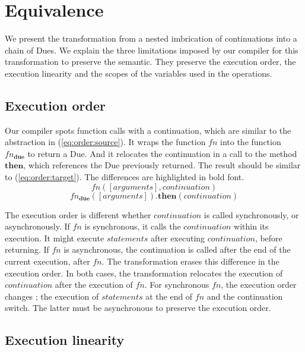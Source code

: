 \section{Equivalence} \label{section:equivalence}


We present the transformation from a nested imbrication of continuations into a chain of Dues.
We explain the three limitations imposed by our compiler for this transformation to preserve the semantic.
They preserve the execution order, the execution linearity and the scopes of the variables used in the operations.

\subsection{Execution order}

Our compiler spots function calls with a continuation, which are similar to the abstraction in (\ref{eq:order:source}).
It wraps the function $fn$ into the function $fn_\textbf{due}$ to return a Due.
And it relocates the continuation in a call to the method $\textbf{then}$, which references the Due previously returned.
The result should be similar to (\ref{eq:order:target}).
The differences are highlighted in bold font.
\begin{equation} \label{eq:order:source}
fn([arguments], continuation)
\end{equation}
\begin{equation} \label{eq:order:target}
fn_\textbf{due}([arguments])\textbf{.then}(continuation)
\end{equation}

The execution order is different whether $continuation$ is called synchronously, or asynchronously.
If $fn$ is synchronous, it calls the $continuation$ within its execution.
It might execute $statements$ after executing $continuation$, before returning.
If $fn$ is asynchronous, the continuation is called after the end of the current execution, after $fn$.
The transformation erases this difference in the execution order.
In both cases, the transformation relocates the execution of $continuation$ after the execution of $fn$.
For synchronous $fn$, the execution order changes ; the execution of $statements$ at the end of $fn$ and the continuation switch.
The latter must be asynchronous to preserve the execution order.

\subsection{Execution linearity}

